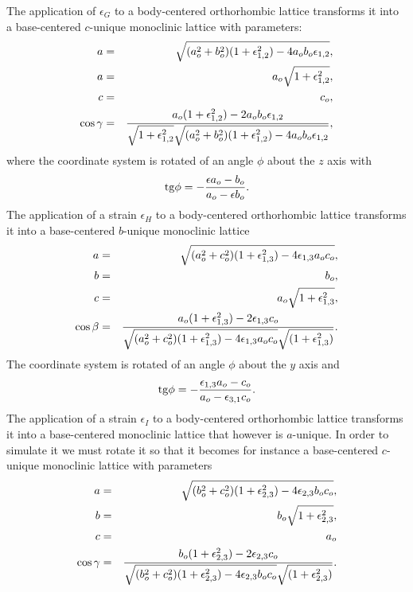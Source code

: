 \documentclass[12pt,a4paper]{article}
\begin{document}
The application of $\epsilon_G$ to a body-centered orthorhombic lattice
transforms it into a base-centered $c$-unique monoclinic lattice with 
parameters:
\begin{eqnarray}
a&=&\sqrt{(a_o^2+b_o^2)(1+\epsilon_{1,2}^2)-4a_ob_o\epsilon_{1,2}}, \\
a&=&a_o \sqrt{1+\epsilon_{1,2}^2}, \\
c&=&c_o,  \\
\cos\gamma &=& {a_o (1+\epsilon_{1,2}^2)-2a_ob_o\epsilon_{1,2} \over
\sqrt{1+\epsilon_{1,2}^2} \sqrt{(a_o^2+b_o^2)
(1+\epsilon_{1,2}^2)-4a_ob_o\epsilon_{1,2}}}, 
\end{eqnarray}
where the coordinate system is rotated of an angle $\phi$ about the $z$
axis with
\begin{equation}
{\rm tg} \phi = -{ \epsilon a_o - b_o \over a_o - \epsilon b_o }.
\end{equation}
The application of a strain $\epsilon_H$ to a body-centered orthorhombic
lattice transforms it into a base-centered $b$-unique monoclinic lattice 
\begin{eqnarray}
a&=&\sqrt{(a_o^2+c_o^2)(1+\epsilon_{1,3}^2)-4\epsilon_{1,3}a_oc_o}, \\
b&=&b_o, \\
c&=&a_o \sqrt{1+\epsilon_{1,3}^2}, \\
\cos\beta &=& {a_o (1+\epsilon_{1,3}^2) -2 \epsilon_{1,3} c_o \over 
\sqrt{(a_o^2+c_o^2)(1+\epsilon_{1,3}^2)-4\epsilon_{1,3}a_oc_o} 
\sqrt{(1+\epsilon_{1,3}^2)}}.
\end{eqnarray}
The coordinate system is rotated of an angle $\phi$ about the $y$ axis
and
\begin{equation}
{\rm tg} \phi = -{\epsilon_{1,3} a_o - c_o \over a_o - \epsilon_{3,1} c_o}.
\end{equation}
The application of a strain $\epsilon_I$ to a body-centered orthorhombic
lattice transforms it into a base-centered monoclinic lattice that however
is $a$-unique. In order to simulate it we must rotate it so that it
becomes for instance a base-centered $c$-unique monoclinic lattice with
parameters
\begin{eqnarray}
a&=&\sqrt{(b_o^2+c_o^2)(1+\epsilon_{2,3}^2)-4\epsilon_{2,3}b_oc_o}, \\
b&=&b_o \sqrt{1+\epsilon_{2,3}^2}, \\
c&=&a_o \\
\cos\gamma &=& {b_o (1+\epsilon_{2,3}^2) -2 \epsilon_{2,3} c_o \over 
\sqrt{(b_o^2+c_o^2)(1+\epsilon_{2,3}^2)-4\epsilon_{2,3}b_oc_o} 
\sqrt{(1+\epsilon_{2,3}^2)}}.
\end{eqnarray}
\end{document}
